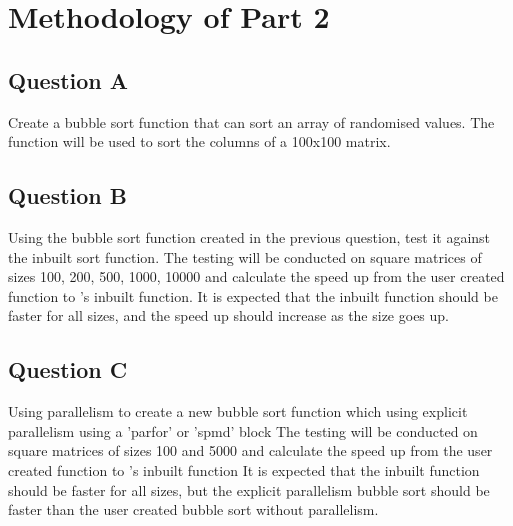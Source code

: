 \section{Methodology of Part 2}

\subsection{Question A}
Create a bubble sort function that can sort an array of randomised values.
The function will be used to sort the columns of a 100x100 matrix.

\subsection{Question B}
Using the bubble sort function created in the previous question, test it against the inbuilt \MATLAB sort function.
The testing will be conducted on square matrices of sizes 100, 200, 500, 1000, 10000 and calculate the speed up from the user created function to \MATLAB's inbuilt function.
It is expected that the inbuilt function should be faster for all sizes, and the speed up should increase as the size goes up.

\subsection{Question C}
Using \MATLAB parallelism to create a new bubble sort function which using explicit parallelism using a 'parfor' or 'spmd' block
The testing will be conducted on square matrices of sizes 100 and 5000 and calculate the speed up from the user created function to \MATLAB's inbuilt function
It is expected that the inbuilt function should be faster for all sizes, but the explicit parallelism bubble sort should be faster than the user created bubble sort without parallelism.